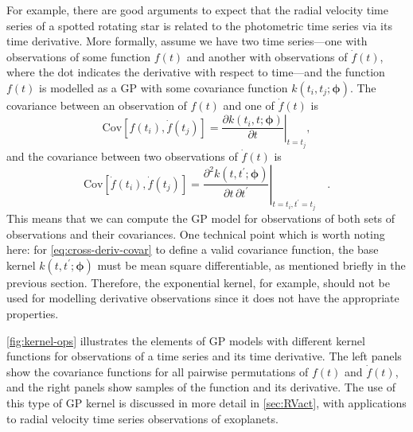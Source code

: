 \documentclass[letterpaper]{ar-1col}
\newcommand{\hyperparams}{\ensuremath{\boldsymbol{\phi}}}
\begin{document}
For example, there are good arguments \citep{2012MNRAS.419.3147A} to expect that the radial velocity time series of a spotted rotating star is related to the photometric time series via its time derivative.
More formally, assume we have two time series---one with observations of some function $f(t)$ and another with observations of $\dot{f}(t)$, where the dot indicates the derivative with respect to time---and the function $f(t)$ is modelled as a GP with some covariance function $k(t_i,t_j;\hyperparams)$. The covariance between an observation of $f(t)$ and one of $\dot{f}(t)$ is
\begin{equation}
  \mathrm{Cov}\left[f(t_i),\dot{f}(t_j)\right] = \left.\frac{\partial k(t_i,t;\hyperparams)}{\partial t}\right|_{t=t_j},
\end{equation}
and the covariance between two observations of $\dot{f}(t)$ is
\begin{equation}
  \label{eq:cross-deriv-covar}
  \mathrm{Cov}\left[\dot{f}(t_i),\dot{f}(t_j)\right] = \left.\frac{\partial^2 k(t,t^\prime;\hyperparams)}{\partial t\,\partial t^\prime}\right|_{t=t_i,t^\prime=t_j} \quad.
\end{equation}
This means that we can compute the GP model for observations of both sets of observations and their covariances.
One technical point which is worth noting here: for \autoref{eq:cross-deriv-covar} to define a valid covariance function, the base kernel $k(t,t^\prime;\hyperparams)$ must be mean square differentiable, as mentioned briefly in the previous section.
Therefore, the exponential kernel, for example, should not be used for modelling derivative observations since it does not have the appropriate properties.

\autoref{fig:kernel-ops} illustrates the elements of GP models with different kernel functions for observations of a time series and its time derivative.
The left panels show the covariance functions for all pairwise permutations of $f(t)$ and $\dot{f}(t)$, and the right panels show samples of the function and its derivative.
The use of this type of GP kernel is discussed in more detail in \autoref{sec:RVact}, with applications to radial velocity time series observations of exoplanets.
\end{document}
